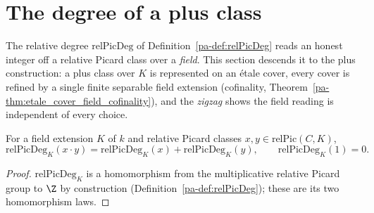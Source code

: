 \section{The degree of a plus class}
\label{pa-sec:degAff}

The relative degree \(\mathrm{relPicDeg}\) of Definition~\ref{pa-def:relPicDeg} reads an honest
integer off a relative Picard class over a \emph{field}. This section descends it to the plus
construction: a plus class over \(K\) is represented on an \'etale cover, every cover is
refined by a single finite separable field extension (cofinality,
Theorem~\ref{pa-thm:etale_cover_field_cofinality}), and the \emph{zigzag} shows the field
reading is independent of every choice.

\begin{lemma}
  \label{pa-lem:relPicDeg_hom}
  \leanok

  For a field extension \(K\) of \(k\) and relative Picard classes
  \(x, y \in \mathrm{relPic}(C, K)\),
  \[
    \mathrm{relPicDeg}_K(x \cdot y) = \mathrm{relPicDeg}_K(x) + \mathrm{relPicDeg}_K(y),
    \qquad \mathrm{relPicDeg}_K(1) = 0 .
  \]
\end{lemma}
\begin{proof}
  \leanok
  \(\mathrm{relPicDeg}_K\) is a homomorphism from the multiplicative relative Picard group to
  \(\Z\) by construction (Definition~\ref{pa-def:relPicDeg}); these are its two homomorphism
  laws.
\end{proof}

